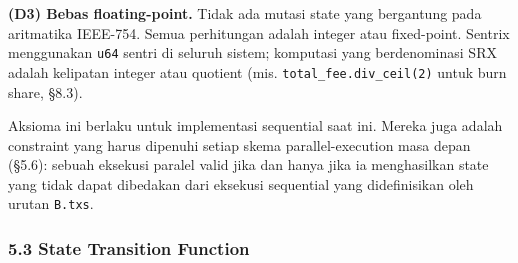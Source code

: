 \documentclass[11pt,a4paper]{article}
\begin{document}
\textbf{(D3) Bebas floating-point.} Tidak ada mutasi state yang bergantung pada aritmatika IEEE-754. Semua perhitungan adalah integer atau fixed-point. Sentrix menggunakan \texttt{u64} sentri di seluruh sistem; komputasi yang berdenominasi SRX adalah kelipatan integer atau quotient (mis. \texttt{total\_fee.div\_ceil(2)} untuk burn share, §8.3).

Aksioma ini berlaku untuk implementasi sequential saat ini. Mereka juga adalah constraint yang harus dipenuhi setiap skema parallel-execution masa depan (§5.6): sebuah eksekusi paralel valid jika dan hanya jika ia menghasilkan state yang tidak dapat dibedakan dari eksekusi sequential yang didefinisikan oleh urutan \texttt{B.txs}.

\hypertarget{state-transition-function}{%
\subsubsection{5.3 State Transition Function}\label{state-transition-function}}
\end{document}
